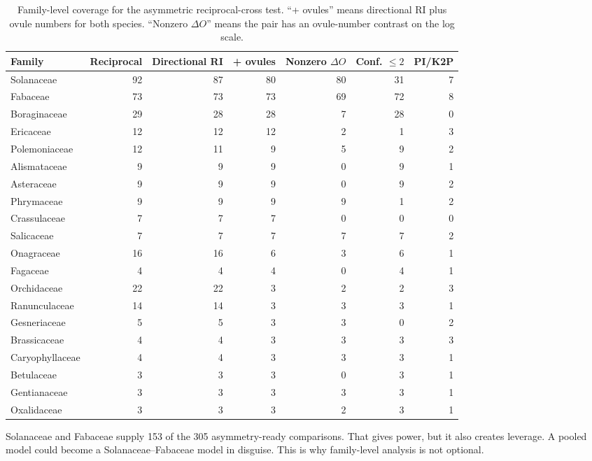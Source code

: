\documentclass[12pt]{article}
\begin{document}
\begin{table}[H]
\centering
\scriptsize
\begin{adjustbox}{max width=\linewidth}
\begin{tabular}{lrrrrrr}
\toprule
Family & Reciprocal & Directional RI & + ovules & Nonzero $\Delta O$ & Conf. $\leq 2$ & PI/K2P \\
\midrule
Solanaceae & 92 & 87 & 80 & 80 & 31 & 7 \\
Fabaceae & 73 & 73 & 73 & 69 & 72 & 8 \\
Boraginaceae & 29 & 28 & 28 & 7 & 28 & 0 \\
Ericaceae & 12 & 12 & 12 & 2 & 1 & 3 \\
Polemoniaceae & 12 & 11 & 9 & 5 & 9 & 2 \\
Alismataceae & 9 & 9 & 9 & 0 & 9 & 1 \\
Asteraceae & 9 & 9 & 9 & 0 & 9 & 2 \\
Phrymaceae & 9 & 9 & 9 & 9 & 1 & 2 \\
Crassulaceae & 7 & 7 & 7 & 0 & 0 & 0 \\
Salicaceae & 7 & 7 & 7 & 7 & 7 & 2 \\
Onagraceae & 16 & 16 & 6 & 3 & 6 & 1 \\
Fagaceae & 4 & 4 & 4 & 0 & 4 & 1 \\
Orchidaceae & 22 & 22 & 3 & 2 & 2 & 3 \\
Ranunculaceae & 14 & 14 & 3 & 3 & 3 & 1 \\
Gesneriaceae & 5 & 5 & 3 & 3 & 0 & 2 \\
Brassicaceae & 4 & 4 & 3 & 3 & 3 & 3 \\
Caryophyllaceae & 4 & 4 & 3 & 3 & 3 & 1 \\
Betulaceae & 3 & 3 & 3 & 0 & 3 & 1 \\
Gentianaceae & 3 & 3 & 3 & 3 & 3 & 1 \\
Oxalidaceae & 3 & 3 & 3 & 2 & 3 & 1 \\
\bottomrule
\end{tabular}
\end{adjustbox}
\caption{Family-level coverage for the asymmetric reciprocal-cross test. ``+ ovules'' means directional RI plus ovule numbers for both species. ``Nonzero $\Delta O$'' means the pair has an ovule-number contrast on the log scale.}
\label{tab:family-coverage}
\end{table}

Solanaceae and Fabaceae supply 153 of the 305 asymmetry-ready comparisons. That gives power, but it also creates leverage. A pooled model could become a Solanaceae--Fabaceae model in disguise. This is why family-level analysis is not optional.
\end{document}
